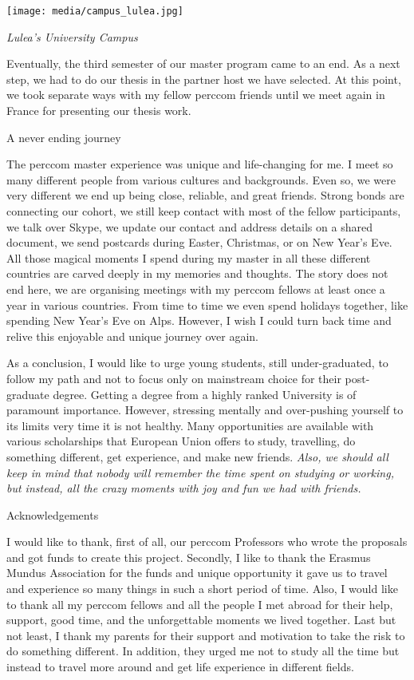 \documentclass[10pt,a4paper]{article} %
\newcommand{\NewsItem}[1]{ %
\usefont{T1}{fvs}{n}{n} %
\vspace{24pt}\large #1\vspace{3pt} %
\par \normalsize \normalfont}
\begin{document}
\begin{multicols}{3}
\begin{center}
	\texttt{[image: media/campus\_lulea.jpg]}
	\par\textit{Lulea's University Campus}
\end{center}

Eventually, the third semester of our master program came to an end. 
As a next step, we had to do our thesis in the partner host we have selected. 
At this point, we took separate ways with my fellow {\sc perccom} friends 
until we meet again in France for presenting our thesis work. 

\NewsItem{A never ending journey}
The {\sc perccom} master experience was unique and life-changing for me. 
I meet so many different people from various cultures and backgrounds. 
Even so, we were very different we end up being close, reliable, and great friends.
Strong bonds are connecting our cohort, we still keep contact with most of the 
fellow participants, we talk over Skype, we update our contact and address details 
on a shared document, we send postcards during Easter, Christmas, 
or on New Year's Eve.
All those magical moments I spend during my master in all these different countries 
are carved deeply in my memories and thoughts. 
The story does not end here, we are organising meetings with my {\sc perccom} 
fellows at least once a year in various countries. 
From time to time we even spend holidays together, like spending New Year's Eve on 
Alps. 
However, I wish I could turn back time and relive this enjoyable and 
unique journey over again. 

As a conclusion, I would like to urge young students, still under-graduated, to 
follow my path and not to focus only on mainstream choice for their post-graduate 
degree. 
Getting a degree from a highly ranked University is of paramount importance. 
However, stressing mentally and over-pushing yourself to its limits very time 
it is not healthy. 
Many opportunities are available with various scholarships that European Union 
offers to study, travelling, do something different, get experience, and make 
new friends.
\textit{Also, we should all keep in mind that nobody will remember the time spent on studying 
or working, but instead, all the crazy moments with joy and fun we had with friends.}
 
\NewsItem{Acknowledgements}
I would like to thank, first of all, our {\sc perccom} Professors who wrote the 
proposals and got funds to create this project. 
Secondly, I like to thank the Erasmus Mundus Association for the funds and unique 
opportunity it gave us to travel and experience so many things in such a short 
period of time. 
Also, I would like to thank all my {\sc perccom} fellows and all the people I met 
abroad for their help, support, 
good time, and the unforgettable moments we lived together. 
Last but not least, I thank my parents for their support and motivation to take the 
risk to do something different. 
In addition, they urged me not to study all the time but instead to travel more 
around and get life experience in different fields.
\end{multicols}
\end{document}
